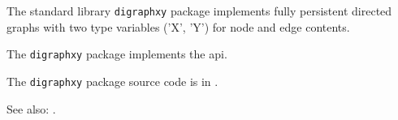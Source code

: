 
The standard library {\tt digraphxy} package implements fully persistent directed graphs with two type variables ('X', 'Y') for node and edge contents.

The {\tt digraphxy} package implements the  api.

The {\tt digraphxy} package source code is in .

See also:  .


